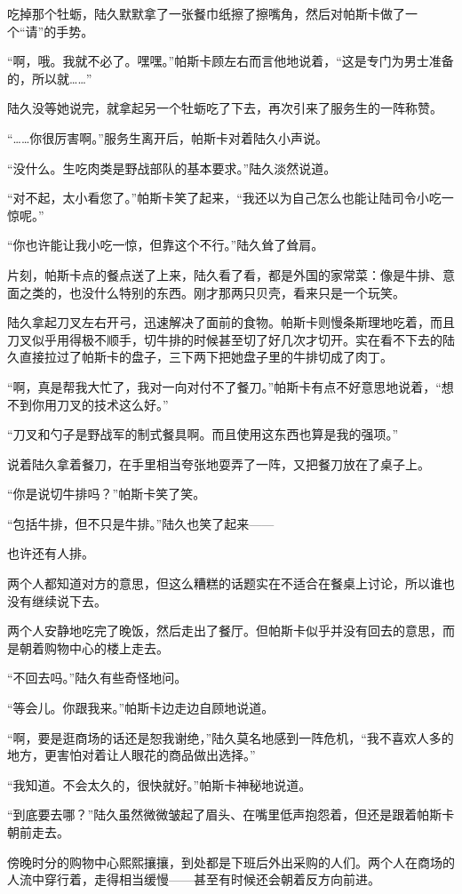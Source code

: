 吃掉那个牡蛎，陆久默默拿了一张餐巾纸擦了擦嘴角，然后对帕斯卡做了一个“请”的手势。

“啊，哦。我就不必了。嘿嘿。”帕斯卡顾左右而言他地说着，“这是专门为男士准备的，所以就……”

陆久没等她说完，就拿起另一个牡蛎吃了下去，再次引来了服务生的一阵称赞。

“……你很厉害啊。”服务生离开后，帕斯卡对着陆久小声说。

“没什么。生吃肉类是野战部队的基本要求。”陆久淡然说道。

“对不起，太小看您了。”帕斯卡笑了起来，“我还以为自己怎么也能让陆司令小吃一惊呢。”

“你也许能让我小吃一惊，但靠这个不行。”陆久耸了耸肩。

片刻，帕斯卡点的餐点送了上来，陆久看了看，都是外国的家常菜：像是牛排、意面之类的，也没什么特别的东西。刚才那两只贝壳，看来只是一个玩笑。

陆久拿起刀叉左右开弓，迅速解决了面前的食物。帕斯卡则慢条斯理地吃着，而且刀叉似乎用得极不顺手，切牛排的时候甚至切了好几次才切开。实在看不下去的陆久直接拉过了帕斯卡的盘子，三下两下把她盘子里的牛排切成了肉丁。

“啊，真是帮我大忙了，我对一向对付不了餐刀。”帕斯卡有点不好意思地说着，“想不到你用刀叉的技术这么好。”

“刀叉和勺子是野战军的制式餐具啊。而且使用这东西也算是我的强项。”

说着陆久拿着餐刀，在手里相当夸张地耍弄了一阵，又把餐刀放在了桌子上。

“你是说切牛排吗？”帕斯卡笑了笑。

“包括牛排，但不只是牛排。”陆久也笑了起来——

也许还有人排。

两个人都知道对方的意思，但这么糟糕的话题实在不适合在餐桌上讨论，所以谁也没有继续说下去。

两个人安静地吃完了晚饭，然后走出了餐厅。但帕斯卡似乎并没有回去的意思，而是朝着购物中心的楼上走去。

“不回去吗。”陆久有些奇怪地问。

“等会儿。你跟我来。”帕斯卡边走边自顾地说道。

“啊，要是逛商场的话还是恕我谢绝，”陆久莫名地感到一阵危机，“我不喜欢人多的地方，更害怕对着让人眼花的商品做出选择。”

“我知道。不会太久的，很快就好。”帕斯卡神秘地说道。

“到底要去哪？”陆久虽然微微皱起了眉头、在嘴里低声抱怨着，但还是跟着帕斯卡朝前走去。

傍晚时分的购物中心熙熙攘攘，到处都是下班后外出采购的人们。两个人在商场的人流中穿行着，走得相当缓慢——甚至有时候还会朝着反方向前进。


